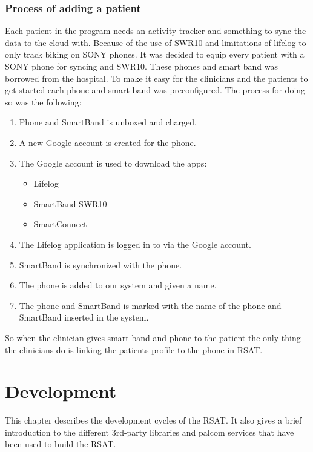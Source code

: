 \documentclass{cslthse-msc}
\begin{document}
\subsection{Process of adding a patient}

Each patient in the program needs an activity tracker and something to sync the data to the cloud with. Because of the use of SWR10 and limitations of lifelog to only track biking on SONY phones. It was decided to equip every patient with a SONY phone for syncing and SWR10. These phones and smart band was borrowed from the hospital. To make it easy for the clinicians and the patients to get started each phone and smart band was preconfigured. The process for doing so was the following:

\begin{enumerate}
    \item{Phone and SmartBand is unboxed and charged.}
    \item{A new Google account is created for the phone.}
    \item{The Google account is used to download the apps:
\begin{itemize}
    \item Lifelog
    \item SmartBand SWR10
    \item SmartConnect 
\end{itemize}}
    \item{The Lifelog application is logged in to via the Google account.}
    \item{SmartBand is synchronized with the phone.}
    \item{The phone is added to our system and given a name.}
    \item{The phone and SmartBand is marked with the name of the phone and SmartBand inserted in the system.}
\end{enumerate}

So when the clinician gives smart band and phone to the patient the only thing the clinicians do is linking the patients profile to the phone in RSAT. %


\chapter{Development}
This chapter describes the development cycles of the RSAT. It also gives a brief introduction to the different 3rd-party libraries and palcom services that have been used to build the RSAT.
\end{document}
